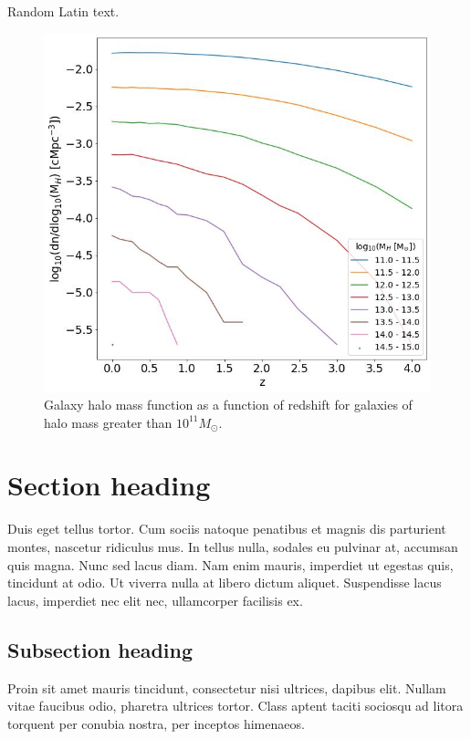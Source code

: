 \documentclass[12pt, onecolumn]{revtex4}    %
\begin{document}
Random Latin text.

\begin{figure}[H]
\centering
\includegraphics[width=\linewidth]{Mass_Function_2.jpeg}
\caption{Galaxy halo mass function as a function of redshift for galaxies of halo mass greater than $10^{11}M_\odot$.}
\label{fig:5}
\end{figure}

\section{Section heading}

Duis eget tellus tortor. Cum sociis natoque penatibus et magnis dis parturient montes, nascetur ridiculus mus. In tellus nulla, sodales eu pulvinar at, accumsan quis magna. Nunc sed lacus diam. Nam enim mauris, imperdiet ut egestas quis, tincidunt at odio. Ut viverra nulla at libero dictum aliquet. Suspendisse lacus lacus, imperdiet nec elit nec, ullamcorper facilisis ex.

\subsection{Subsection heading}

Proin sit amet mauris tincidunt, consectetur nisi ultrices, dapibus elit. Nullam vitae faucibus odio, pharetra ultrices tortor. Class aptent taciti sociosqu ad litora torquent per conubia nostra, per inceptos himenaeos. 
\end{document}
